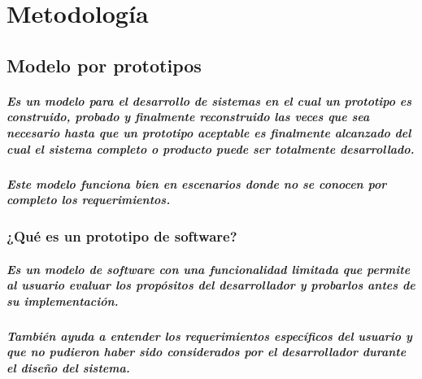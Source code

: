 \clearpage
\chapter{Metodología}

\section{Modelo por prototipos}
  \paragraph{Es un modelo para el desarrollo de sistemas en el cual un prototipo es construido, probado y finalmente reconstruido las veces que sea necesario hasta que un prototipo aceptable es finalmente alcanzado del cual el sistema completo o producto puede ser totalmente desarrollado.}

  \paragraph{Este modelo funciona bien en escenarios donde no se conocen por completo los requerimientos.}

\subsection{¿Qué es un prototipo de software?}
  \paragraph{Es un modelo de software con una funcionalidad limitada que permite al usuario evaluar los propósitos del desarrollador y probarlos antes de su implementación.}
  \paragraph{También ayuda a entender los requerimientos específicos del usuario y que no pudieron haber sido considerados por el desarrollador durante el diseño del sistema.}


